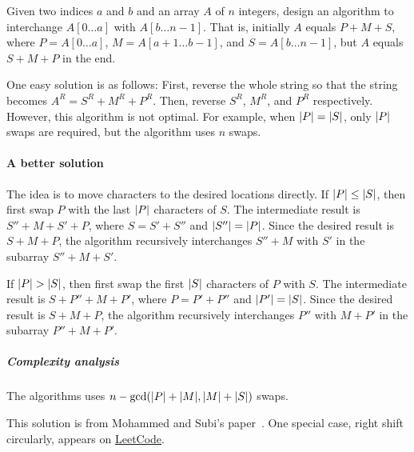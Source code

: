 \begin{Exercise}[title=Block interchange]
Given two indices $a$ and $b$ and an array $A$ of $n$ integers, design an algorithm to interchange $A[0 \dots a]$ with $A[b \dots n - 1]$.
That is, initially $A$ equals $P + M + S$, where $P = A[0 \dots a]$, $M = A[a+1 \dots b-1]$, and $S = A[b \dots n - 1]$, but $A$ equals $S + M + P$ in the end.
\end{Exercise}
\begin{Answer}
One easy solution is as follows:
First, reverse the whole string so that the string becomes $A^R = S^R + M^R + P^R$.
Then, reverse $S^R$, $M^R$, and $P^R$ respectively.
However, this algorithm is not optimal.
For example, when $\lvert P\rvert = \lvert S\rvert$, only $\lvert P\rvert$ swaps are required, but the algorithm uses $n$ swaps.

\paragraph{A better solution}  The idea is to move characters to the desired locations directly.
If $\lvert P\rvert \leq \lvert S\rvert$, then first swap $P$ with the last $\lvert P\rvert$ characters of $S$.
The intermediate result is $S'' + M + S' + P$, where $S = S' + S''$ and $\lvert S''\rvert = \lvert P\rvert$. 
Since the desired result is $S + M + P$, the algorithm recursively interchanges $S'' + M$ with $S'$ in the subarray $S'' + M + S'$.

If $\lvert P\rvert > \lvert S\rvert$, then first swap the first $\lvert S\rvert$ characters of $P$ with $S$.
The intermediate result is $S + P'' + M + P'$, where $P = P' + P''$ and $\lvert P'\rvert = \lvert S\rvert$. 
Since the desired result is $S + M + P$, the algorithm recursively interchanges $P''$ with $M + P'$ in the subarray $P'' + M + P'$.

\subparagraph{Complexity analysis} The algorithms uses $n - \text{gcd}(\lvert P\rvert + \lvert M\rvert, \lvert M\rvert + \lvert S\rvert)$ swaps.
\begin{remark}
This solution is from Mohammed and Subi's paper~\cite{Mohammed1987}. 
One special case, right shift circularly, appears on \href{https://leetcode.com/problems/rotate-array/}{LeetCode}.
\end{remark}
\end{Answer}


